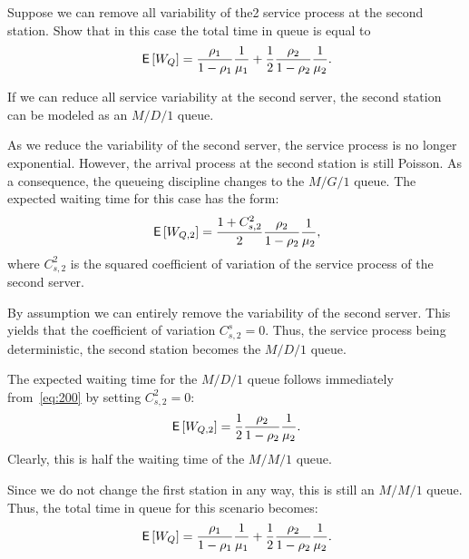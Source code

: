 \begin{exercise}
Suppose we can remove all variability of the2 service process at the second station. Show that in this case the total time in queue is equal to
\begin{equation*}
 \,\mathsf{E}\left[W_Q\right]= \frac{\rho_1}{1-\rho_1} \frac1{\mu_1} +
 \frac12\frac{\rho_2}{1-\rho_2} \frac1{\mu_2}.
\end{equation*}
\begin{hint}
 If we can reduce all service variability at the second server, the second station can be modeled as an $M/D/1$ queue.
\end{hint}
\begin{solution}
As we reduce the variability of the second server, the service process
is no longer exponential. However, the arrival process at the second
station is still Poisson. As a consequence, the queueing discipline
changes to the $M/G/1$ queue. The expected waiting time for this case
has the form:
\begin{equation}\label{eq:200}
\,\mathsf{E}\left[W_{Q,2}\right] = \frac{1+C_{s,2}^2}2\frac{\rho_2}{1-\rho_2} \frac1{\mu_2},
\end{equation}
where $C_{s,2}^2$ is the squared coefficient of variation of the
service process of the second server.

By assumption we can entirely remove the variability of the second server.
This yields that the coefficient of variation $C_{s,2}^s = 0$.
Thus, the service process being deterministic, the second station becomes the $M/D/1$ queue.

The expected waiting time for the $M/D/1$ queue follows immediately
from~\cref{eq:200} by setting $C_{s,2}^2 =0$:
\begin{equation}\label{eq:300}
\,\mathsf{E}\left[W_{Q,2}\right] = \frac{1}2\frac{\rho_2}{1-\rho_2} \frac1{\mu_2}.
\end{equation}
Clearly, this is half the waiting time of the $M/M/1$ queue. 

Since we do not change the first station in any way, this is still an
$M/M/1$ queue. 
Thus, the total time in queue for this scenario becomes:
\begin{equation*}
 \,\mathsf{E}\left[W_Q\right]= \frac{\rho_1}{1-\rho_1} \frac1{\mu_1} +
 \frac12\frac{\rho_2}{1-\rho_2} \frac1{\mu_2}. 
\end{equation*}
\end{solution}
\end{exercise}

